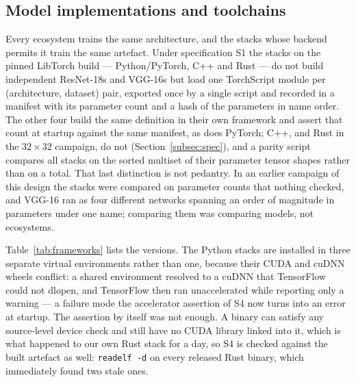 \subsection{Model implementations and toolchains}
\label{app:implementations}

Every ecosystem trains the same architecture, and the stacks whose backend
permits it train the same artefact. Under specification S1 the \vCtrlStacks{}
stacks on the pinned LibTorch build --- Python/PyTorch, C++ and Rust --- do not
build \vCtrlStacks{} independent ResNet-18s and VGG-16s but load one TorchScript
module per (architecture, dataset) pair, exported once by a single script and
recorded in a manifest with its parameter count and a hash of the parameters in
name order. The
other four build the same definition in their own framework and assert that count
at startup against the same manifest, as does PyTorch; C++, and Rust in the
$32\times32$ campaign, do not (Section~\ref{subsec:spec}), and a parity script compares all
\vEcosystems{} stacks on the sorted multiset of their parameter tensor shapes
rather than on a total. That last distinction is not pedantry. In an earlier
campaign of this design the stacks were compared on parameter counts that nothing
checked, and VGG-16 ran as four different networks spanning an order of magnitude
in parameters under one name; comparing them was comparing models, not
ecosystems.

Table~\ref{tab:frameworks} lists the versions. The Python stacks are installed
in three separate virtual environments rather than one, because their CUDA and
cuDNN wheels conflict: a shared environment resolved to a cuDNN that TensorFlow
could not dlopen, and TensorFlow then ran unaccelerated while reporting only a
warning --- a failure mode the accelerator assertion of S4 now turns into an
error at startup. The assertion by itself was not enough. A binary can satisfy
any source-level device check and still have no CUDA library linked into it,
which is what happened to our own Rust stack for a day, so S4 is checked against
the built artefact as well: \texttt{readelf -d} on every released Rust binary,
which immediately found two stale ones.

